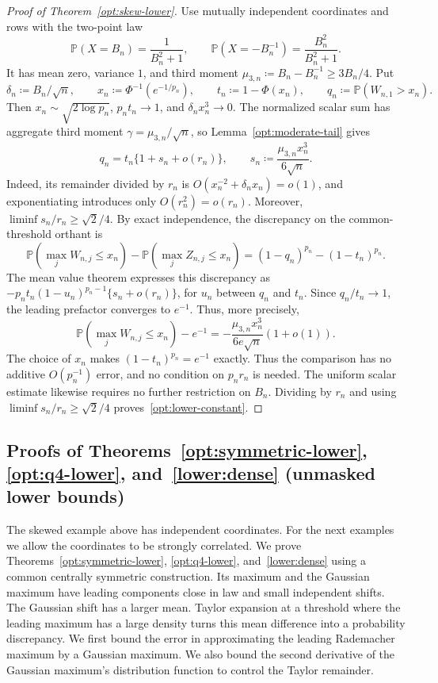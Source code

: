 \documentclass[11pt,letterpaper]{article}
\theoremstyle{remark}
\newcommand{\Pp}{\mathbb P}
\begin{document}
\begin{proof}[Proof of Theorem~\ref{opt:skew-lower}]
Use mutually independent coordinates and rows with the two-point law
\begin{equation}
 \Pp(X=B_n)=\frac1{B_n^2+1},\qquad
 \Pp(X=-B_n^{-1})=\frac{B_n^2}{B_n^2+1}.
 \label{opt:two-point-law}
\end{equation}
It has mean zero, variance \(1\), and third moment
\(\mu_{3,n}\coloneqq B_n-B_n^{-1}\ge3B_n/4\). Put
\[
 \delta_n\coloneqq B_n/\sqrt n,\qquad
 x_n\coloneqq\Phi^{-1}(e^{-1/p_n}),\qquad
 t_n\coloneqq1-\Phi(x_n),\qquad q_n\coloneqq\Pp(W_{n,1}>x_n).
\]
Then \(x_n\sim\sqrt{2\log p_n}\), \(p_nt_n\to1\), and
\(\delta_nx_n^3\to0\). The normalized scalar sum has aggregate
third moment \(\gamma=\mu_{3,n}/\sqrt n\), so
Lemma~\ref{opt:moderate-tail} gives
\begin{equation}
 q_n=t_n\{1+s_n+o(r_n)\},\qquad
 s_n\coloneqq\frac{\mu_{3,n}x_n^3}{6\sqrt n}.
 \label{opt:tail-linearization}
\end{equation}
Indeed, its remainder divided by \(r_n\) is
\(O(x_n^{-2}+\delta_nx_n)=o(1)\), and exponentiating introduces only
\(O(r_n^2)=o(r_n)\). Moreover,
\(\liminf s_n/r_n\ge\sqrt2/4\).
By exact independence, the discrepancy on the common-threshold orthant is
\[
 \Pp(\max_jW_{n,j}\le x_n)-\Pp(\max_jZ_{n,j}\le x_n)
 =(1-q_n)^{p_n}-(1-t_n)^{p_n}.
\]
The mean value theorem expresses this discrepancy as
\(-p_nt_n(1-u_n)^{p_n-1}\{s_n+o(r_n)\}\), for \(u_n\) between
\(q_n\) and \(t_n\). Since \(q_n/t_n\to1\), the leading prefactor
converges to \(e^{-1}\). Thus, more precisely,
\begin{equation}
 \Pp(\max_jW_{n,j}\le x_n)-e^{-1}
 =-\frac{\mu_{3,n}x_n^3}{6e\sqrt n}(1+o(1)).
 \label{opt:exact-product-asymptotic}
\end{equation}
The choice of \(x_n\) makes \((1-t_n)^{p_n}=e^{-1}\) exactly.
Thus the comparison has no additive \(O(p_n^{-1})\) error, and no
condition on \(p_nr_n\) is needed. The uniform scalar estimate likewise
requires no further restriction on \(B_n\). Dividing by \(r_n\) and
using \(\liminf s_n/r_n\ge\sqrt2/4\) proves~\eqref{opt:lower-constant}.
\end{proof}

\subsection{Proofs of Theorems~\ref*{opt:symmetric-lower}, \ref*{opt:q4-lower}, and~\ref*{lower:dense} (unmasked lower bounds)}
\label{app:symmetric-lower}
The skewed example above has independent coordinates. For the next
examples we allow the coordinates to be strongly correlated. We prove Theorems~\ref{opt:symmetric-lower},
\ref{opt:q4-lower}, and~\ref{lower:dense} using a common centrally symmetric construction. Its maximum and the Gaussian
maximum have leading components close in law and small independent
shifts. The Gaussian shift has a larger mean. Taylor expansion at a threshold
where the leading maximum has a large density turns this mean difference
into a probability discrepancy. We first bound the error in approximating the leading Rademacher
maximum by a Gaussian maximum. We also bound the second derivative
of the Gaussian maximum's distribution function to control the Taylor
remainder.
\end{document}
